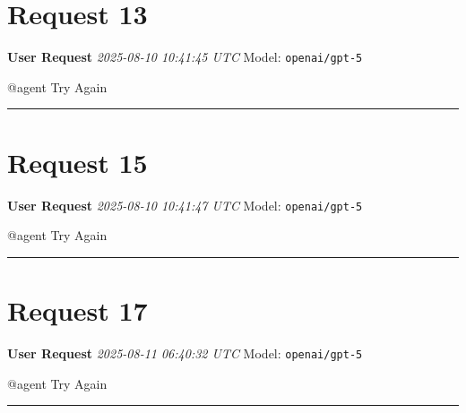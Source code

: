 \documentclass[11pt,a4paper]{article}
\begin{document}
\section{Request 13}
\begin{userbox}
\textbf{User Request}
\quad \textit{2025-08-10 10:41:45 UTC}
\quad Model: \texttt{openai/gpt-5}

@agent Try Again

\end{userbox}
\bigskip\hrule\bigskip
\section{Request 15}
\begin{userbox}
\textbf{User Request}
\quad \textit{2025-08-10 10:41:47 UTC}
\quad Model: \texttt{openai/gpt-5}

@agent Try Again

\end{userbox}
\bigskip\hrule\bigskip
\section{Request 17}
\begin{userbox}
\textbf{User Request}
\quad \textit{2025-08-11 06:40:32 UTC}
\quad Model: \texttt{openai/gpt-5}

@agent Try Again

\end{userbox}
\bigskip\hrule\bigskip
\end{document}
